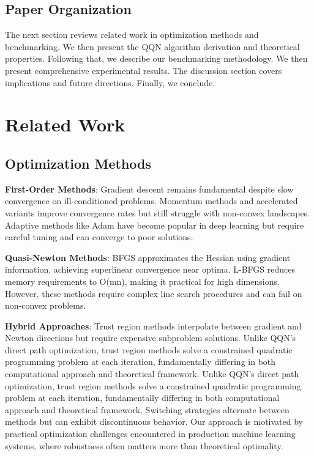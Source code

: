 \hypertarget{paper-organization}{%
\subsection{Paper Organization}\label{paper-organization}}

The next section reviews related work in optimization methods and benchmarking.
We then present the QQN algorithm derivation and theoretical properties.
Following that, we describe our benchmarking methodology.
We then present comprehensive experimental results.
The discussion section covers implications and future directions.
Finally, we conclude.

\hypertarget{related-work}{%
\section{Related Work}\label{related-work}}

\hypertarget{optimization-methods}{%
\subsection{Optimization Methods}\label{optimization-methods}}

\textbf{First-Order Methods}: Gradient descent \citep{cauchy1847methode} remains fundamental despite slow convergence on ill-conditioned problems.
Momentum methods \citep{polyak1964some} and accelerated variants \citep{nesterov1983method} improve convergence rates but still struggle with non-convex landscapes.
Adaptive methods like Adam \citep{kingma2015adam} have become popular in deep learning but require careful tuning and can converge to poor solutions.

\textbf{Quasi-Newton Methods}: BFGS \citep{broyden1970convergence, fletcher1970new, goldfarb1970family, shanno1970conditioning} approximates the Hessian using gradient information, achieving superlinear convergence near optima.
L-BFGS \citep{liu1989limited} reduces memory requirements to O(mn), making it practical for high dimensions.
However, these methods require complex line search procedures and can fail on non-convex problems.

\textbf{Hybrid Approaches}: Trust region methods \citep{more1983computing} interpolate between gradient and Newton directions but require expensive subproblem solutions.
Unlike QQN's direct path optimization, trust region methods solve a constrained quadratic programming problem at each iteration, fundamentally differing in both computational approach and theoretical framework.
Unlike QQN's direct path optimization, trust region methods solve a constrained quadratic programming problem at each iteration, fundamentally differing in both computational approach and theoretical framework.
Switching strategies \citep{morales2000automatic} alternate between methods but can exhibit discontinuous behavior.
Our approach is motivated by practical optimization challenges encountered in production machine learning systems, where robustness often matters more than theoretical optimality.

